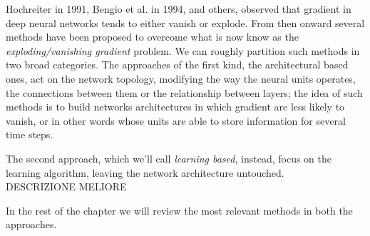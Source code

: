 
Hochreiter\cite{lstm} in 1991, Bengio et al.\cite{learningIsDifficult} in 1994, and others, observed that gradient in 
deep neural networks tends to either vanish or explode. From then onward several methods have been proposed to 
overcome what is now know as the \textit{exploding/vanishing gradient} problem. We can roughly partition such methods in 
two broad categories.
The approaches of the first kind, the architectural based ones, act on the network topology, modifying the way the 
neural units operates, the connections between them or the relationship between layers; the idea of such methods is to 
build networks architectures in which gradient are less likely to vanish, or in other words whose units are able to 
store information for several time steps.

The second approach, which we'll call \textit{learning based}, instead, focus on the learning algorithm, leaving the 
network architecture untouched.
\\DESCRIZIONE MELIORE


In the rest of the chapter we will review the most relevant methods in both the approaches.
